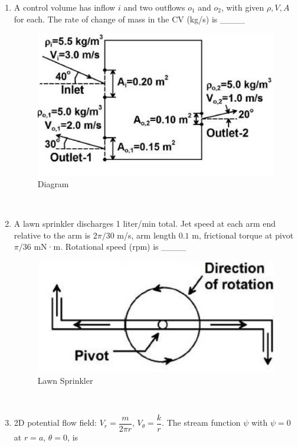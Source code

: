 \documentclass[journal,12pt,onecolumn]{IEEEtran}
\begin{document}
\begin{enumerate}[label=\arabic*)]
\newpage

\item A control volume has inflow $i$ and two outflows $o_1$ and $o_2$, with given $\rho, V, A$ for each. The rate of change of mass in the CV (kg/s) is \_\_\_\_
\vspace{0.2cm}

\begin{figure}[htbp]
  \centering
  \includegraphics[width=.68\linewidth]{figs/B/fig5.png} 
  \caption{Diagram}
  \label{B/fig5}
\end{figure}
\hfill{} \\

\vspace{0.5cm}

\item A lawn sprinkler discharges 1 liter/min total. Jet speed at each arm end relative to the arm is $2\pi/30$ m/s, arm length $0.1$ m, frictional torque at pivot $\pi/36$ mN·m. Rotational speed (rpm) is \_\_\_\_

\begin{figure}[htbp]
  \centering
  \includegraphics[width=.5\linewidth]{figs/B/fig6.png} 
  \caption{Lawn Sprinkler}
  \label{B/fig6}
\end{figure}
\hfill{} \\

\vspace{0.5cm}

\item 2D potential flow field: $V_r = \dfrac{m}{2\pi r}$, $V_\theta = \dfrac{k}{r}$. The stream function $\psi$ with $\psi=0$ at $r=a$, $\theta=0$, is
\vspace{0.05cm}
\hfill{} \\


\end{enumerate}
\end{document}
